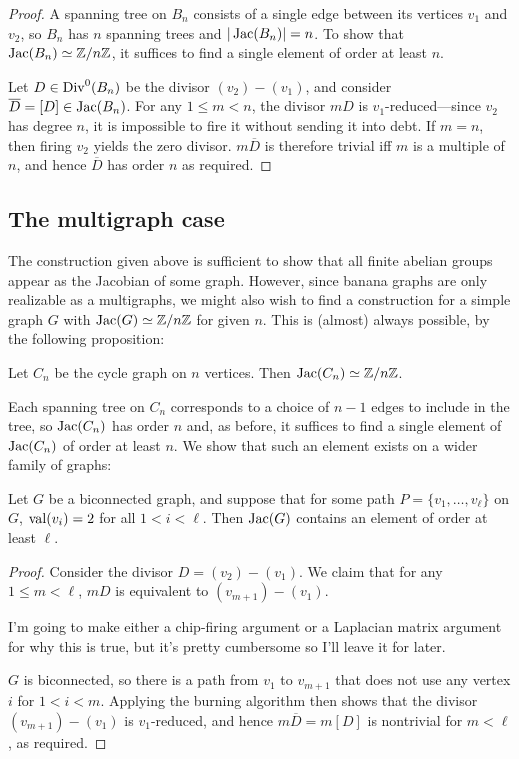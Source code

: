 \documentclass{amsart}
\begin{document}
\begin{proof}
  A spanning tree on $B_n$ consists of a single edge between its
  vertices $v_1$ and $v_2$, so $B_n$ has $n$ spanning trees and
  $|\operatorname{Jac}(B_n)| = n$. To show that $\operatorname{Jac}(B_n) \simeq \mathbb{Z}/n\mathbb{Z}$, it
  suffices to find a single element of order at least $n$.

  Let $D \in \operatorname{Div}^0(B_n)$ be the divisor $(v_2) - (v_1)$, and consider
  $\overline{D} = [D] \in \operatorname{Jac}(B_n)$. For any $1 \le m < n$, the
  divisor $mD$ is $v_1$-reduced---since $v_2$ has degree $n$, it is
  impossible to fire it without sending it into debt. If $m=n$, then
  firing $v_2$ yields the zero divisor. $m\overline{D}$ is therefore
  trivial iff $m$ is a multiple of $n$, and hence $\overline{D}$ has
  order $n$ as required.
\end{proof}

\subsection{The multigraph case}
The construction given above is sufficient to show that all finite
abelian groups appear as the Jacobian of some graph. However, since
banana graphs are only realizable as a multigraphs, we might also wish
to find a construction for a simple graph $G$ with $\operatorname{Jac}(G) \simeq
\mathbb{Z}/n\mathbb{Z}$ for given $n$. This is (almost) always possible, by the
following proposition:

\begin{prop}
  \label{prop:cycle_cyclic}
  Let $C_n$ be the cycle graph on $n$ vertices. Then $\operatorname{Jac}(C_n) \simeq
  \mathbb{Z}/n\mathbb{Z}$.
\end{prop}

Each spanning tree on $C_n$ corresponds to a choice of $n-1$ edges to
include in the tree, so $\operatorname{Jac}(C_n)$ has order $n$ and, as before, it
suffices to find a single element of $\operatorname{Jac}(C_n)$ of order at least
$n$. We show that such an element exists on a wider family of graphs:

\begin{lem}
  \label{lem:2valent_path}
  Let $G$ be a biconnected graph, and suppose that for some path $P =
  \{v_1, \ldots, v_\ell\}$ on $G$, $\operatorname{val}(v_i) = 2$ for all $1 < i <
  \ell$. Then $\operatorname{Jac}(G)$ contains an element of order at least $\ell$.
\end{lem}
\begin{proof}
  Consider the divisor $D = (v_2) - (v_1)$. We claim that for any $1
  \le m < \ell$, $mD$ is equivalent to $(v_{m+1}) - (v_1)$.

  I'm going to make either a chip-firing argument or a Laplacian
  matrix argument for why this is true, but it's pretty cumbersome so
  I'll leave it for later.

  $G$ is biconnected, so there is a path from $v_1$ to $v_{m+1}$ that
  does not use any vertex $i$ for $1 < i < m$. Applying the burning
  algorithm then shows that the divisor $(v_{m+1}) - (v_1)$ is
  $v_1$-reduced, and hence $m\overline{D} = m[D]$ is nontrivial for $m <
  \ell$, as required.
\end{proof}
\end{document}
